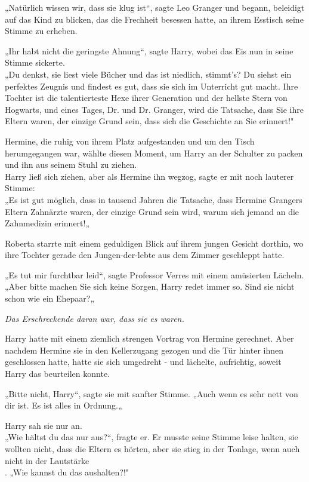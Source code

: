 {„Natürlich wissen wir, dass sie klug ist“, sagte Leo Granger und begann, beleidigt auf das Kind zu blicken, das die Frechheit besessen hatte, an ihrem Esstisch seine Stimme zu erheben.

„Ihr habt nicht die geringste Ahnung“, sagte Harry, wobei das Eis nun in seine Stimme sickerte.\\ „Du denkst, sie liest viele Bücher und das ist niedlich, stimmt's? Du siehst ein perfektes Zeugnis und findest es gut, dass sie sich im Unterricht gut macht. Ihre Tochter ist die talentierteste Hexe ihrer Generation und der hellste Stern von Hogwarts, und eines Tages, Dr. und Dr. Granger, wird die Tatsache, dass Sie ihre Eltern waren, der einzige Grund sein, dass sich die Geschichte an Sie erinnert!"

Hermine, die ruhig von ihrem Platz aufgestanden und um den Tisch herumgegangen war, wählte diesen Moment, um Harry an der Schulter zu packen und ihn aus seinem Stuhl zu ziehen.\\ Harry ließ sich ziehen, aber als Hermine ihn wegzog, sagte er mit noch lauterer Stimme:\\ „Es ist gut möglich, dass in tausend Jahren die Tatsache, dass Hermine Grangers Eltern Zahnärzte waren, der einzige Grund sein wird, warum sich jemand an die Zahnmedizin erinnert!„

Roberta starrte mit einem geduldigen Blick auf ihrem jungen Gesicht dorthin, wo ihre Tochter gerade den Jungen-der-lebte aus dem Zimmer geschleppt hatte.

„Es tut mir furchtbar leid“, sagte Professor Verres mit einem amüsierten Lächeln.\\ „Aber bitte machen Sie sich keine Sorgen, Harry redet immer so. Sind sie nicht schon wie ein Ehepaar?„

\emph{Das Erschreckende daran war, dass sie es waren.}

Harry hatte mit einem ziemlich strengen Vortrag von Hermine gerechnet. Aber nachdem Hermine sie in den Kellerzugang gezogen und die Tür hinter ihnen geschlossen hatte, hatte sie sich umgedreht - und lächelte, aufrichtig, soweit Harry das beurteilen konnte.

„Bitte nicht, Harry“, sagte sie mit sanfter Stimme. „Auch wenn es sehr nett von dir ist. Es ist alles in Ordnung.„

Harry sah sie nur an.\\ „Wie hältst du das nur aus?“, fragte er. Er musste seine Stimme leise halten, sie wollten nicht, dass die Eltern es hörten, aber sie stieg in der Tonlage, wenn auch nicht in der Lautstärke\\ . „Wie kannst du das aushalten?!"

}
